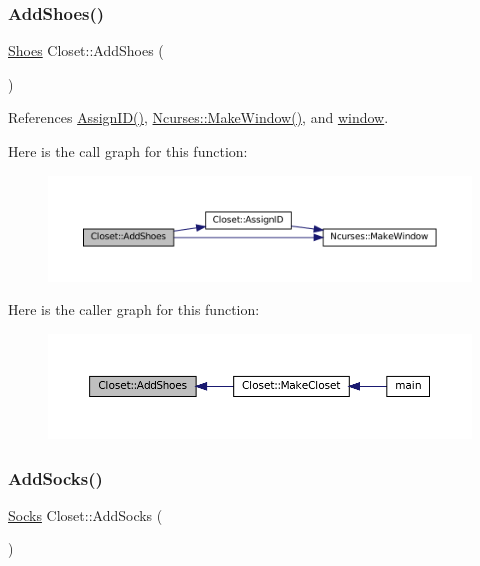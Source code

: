 \subsubsection{\texorpdfstring{Add\+Shoes()}{AddShoes()}}
{\footnotesize\ttfamily \mbox{\hyperlink{classShoes}{Shoes}} Closet\+::\+Add\+Shoes (\begin{DoxyParamCaption}{ }\end{DoxyParamCaption})\hspace{0.3cm}{\ttfamily [private]}}



References \mbox{\hyperlink{classCloset_afabc27d621abdf0089a6b3027ea8f470}{Assign\+I\+D()}}, \mbox{\hyperlink{classNcurses_a1d8def11419a444c5696b5043da680d4}{Ncurses\+::\+Make\+Window()}}, and \mbox{\hyperlink{classCloset_af1eb4f786cc4eccd3018b90632236a93}{window}}.

Here is the call graph for this function\+:\nopagebreak
\begin{figure}[H]
\begin{center}
\leavevmode
\includegraphics[width=350pt]{classCloset_a489badac5a919460e8cc8e216f8b3eac_cgraph}
\end{center}
\end{figure}
Here is the caller graph for this function\+:\nopagebreak
\begin{figure}[H]
\begin{center}
\leavevmode
\includegraphics[width=350pt]{classCloset_a489badac5a919460e8cc8e216f8b3eac_icgraph}
\end{center}
\end{figure}
\mbox{\label{classCloset_aac44ecf78525b3e0ac4ed80af2133186}} 
\subsubsection{\texorpdfstring{Add\+Socks()}{AddSocks()}}
{\footnotesize\ttfamily \mbox{\hyperlink{classSocks}{Socks}} Closet\+::\+Add\+Socks (\begin{DoxyParamCaption}{ }\end{DoxyParamCaption})\hspace{0.3cm}{\ttfamily [private]}}



